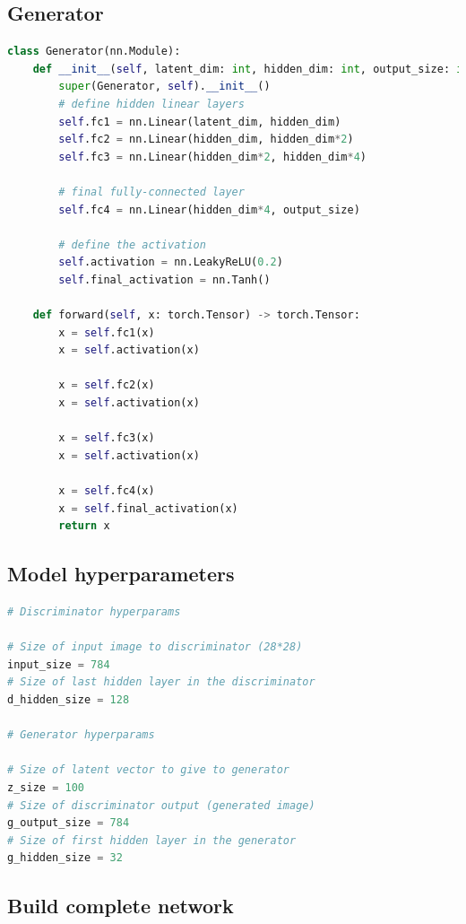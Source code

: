 \subsection{Generator}

\begin{lstlisting}[language=Python]
class Generator(nn.Module):
    def __init__(self, latent_dim: int, hidden_dim: int, output_size: int):
        super(Generator, self).__init__()
        # define hidden linear layers
        self.fc1 = nn.Linear(latent_dim, hidden_dim)
        self.fc2 = nn.Linear(hidden_dim, hidden_dim*2)
        self.fc3 = nn.Linear(hidden_dim*2, hidden_dim*4)
        
        # final fully-connected layer
        self.fc4 = nn.Linear(hidden_dim*4, output_size)
        
        # define the activation
        self.activation = nn.LeakyReLU(0.2)
        self.final_activation = nn.Tanh()

    def forward(self, x: torch.Tensor) -> torch.Tensor:
        x = self.fc1(x)
        x = self.activation(x)

        x = self.fc2(x)
        x = self.activation(x)

        x = self.fc3(x)
        x = self.activation(x)
        
        x = self.fc4(x)
        x = self.final_activation(x)
        return x
\end{lstlisting}

\subsection{Model hyperparameters}

\begin{lstlisting}[language=Python]
# Discriminator hyperparams

# Size of input image to discriminator (28*28)
input_size = 784
# Size of last hidden layer in the discriminator
d_hidden_size = 128

# Generator hyperparams

# Size of latent vector to give to generator
z_size = 100
# Size of discriminator output (generated image)
g_output_size = 784
# Size of first hidden layer in the generator
g_hidden_size = 32
\end{lstlisting}

\subsection{Build complete network}

